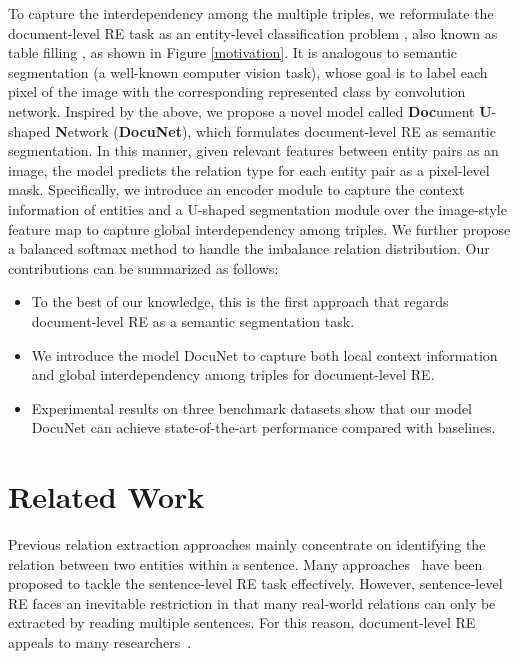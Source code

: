 \documentclass{article}
\begin{document}
To capture the interdependency among the multiple triples, we reformulate the document-level RE task as an entity-level classification problem \cite{jiang2019generalizing}, also known as table filling \cite{miwa2014modeling,gupta2016table}, as shown in Figure \ref{motivation}. It is analogous to semantic segmentation (a well-known computer vision task), whose goal is to label each pixel of the image with the corresponding represented class by convolution network.
Inspired by the above, we propose a novel model called \textbf{Doc}ument \textbf{U}-shaped \textbf{N}etwork (\textbf{DocuNet}), which formulates document-level RE as semantic segmentation. In this manner, given relevant features between entity pairs as an image, the model predicts the relation type for each entity pair as a pixel-level mask.  
Specifically, we introduce an encoder module to capture the context information of entities and a U-shaped segmentation module over the image-style feature map to capture global interdependency among triples. We further propose a balanced softmax method to handle the imbalance relation distribution. 
Our contributions can be summarized as follows:
\begin{itemize}
    \item To the best of our knowledge, this is the first approach that regards document-level RE as a semantic segmentation task. 
    \item We introduce the model DocuNet to capture both local context information and global interdependency among triples for document-level RE. 
    \item Experimental results on three benchmark datasets show that our model DocuNet can achieve state-of-the-art performance compared with baselines.
\end{itemize}


\section{Related Work}

Previous relation extraction approaches mainly concentrate on identifying the relation between two entities within a sentence. Many approaches~\cite{zeng2015distant,feng2018reinforcement,zhang2018attention,zhang2019long,zhang2020relation,DBLP:conf/emnlp/ZhangDBYYCHZC20,DBLP:journals/corr/abs-2009-09841,ye2020contrastive,yu2020bridging,DBLP:journals/corr/abs-2009-09841,wu2021curriculum,DBLP:journals/corr/abs-2104-07650,zheng2021prgc} have been proposed to tackle the sentence-level RE task effectively. However, sentence-level RE faces an inevitable restriction in that many real-world relations can only be extracted by reading multiple sentences. For this reason, document-level RE appeals to many researchers~\cite{tang2020hin,Nan2020ReasoningWL,zeng2020double,wang2020global,xiao2020denoising}.
\end{document}
